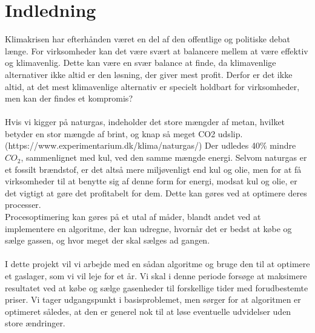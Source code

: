 \chapter{Indledning}
Klimakrisen har efterhånden været en del af den offentlige og politiske debat længe. For virksomheder kan det være svært at balancere mellem at være effektiv og klimavenlig. Dette kan være en svær balance at finde, da klimavenlige alternativer ikke altid er den løsning, der giver mest profit. Derfor er det ikke altid, at det mest klimavenlige alternativ er specielt holdbart for virksomheder, men kan der findes et kompromis? \\ \\Hvis vi kigger på naturgas, indeholder det store mængder af metan, hvilket betyder en stor mængde af brint, og knap så meget CO2 udslip. (https://www.experimentarium.dk/klima/naturgas/) Der udledes 40$\%$ mindre $CO_{2}$, sammenlignet med kul, ved den samme mængde energi. Selvom naturgas er et fossilt brændstof, er det altså mere miljøvenligt end kul og olie, men for at få virksomheder til at benytte sig af denne form for energi, modsat kul og olie, er det vigtigt at gøre det profitabelt for dem. Dette kan gøres ved at optimere deres processer. \\ Procesoptimering kan gøres på et utal af måder, blandt andet ved at implementere en algoritme, der kan udregne, hvornår det er bedst at købe og sælge gassen, og hvor meget der skal sælges ad gangen. \\
\\I dette projekt vil vi arbejde med en sådan algoritme og bruge den til at optimere et gaslager, som vi vil leje for et år. Vi skal i denne periode forsøge at maksimere resultatet ved at købe og sælge gasenheder til forskellige tider med forudbestemte priser. Vi tager udgangspunkt i basisproblemet, men sørger for at algoritmen er optimeret således, at den er generel nok til at løse eventuelle udvidelser uden store ændringer.

